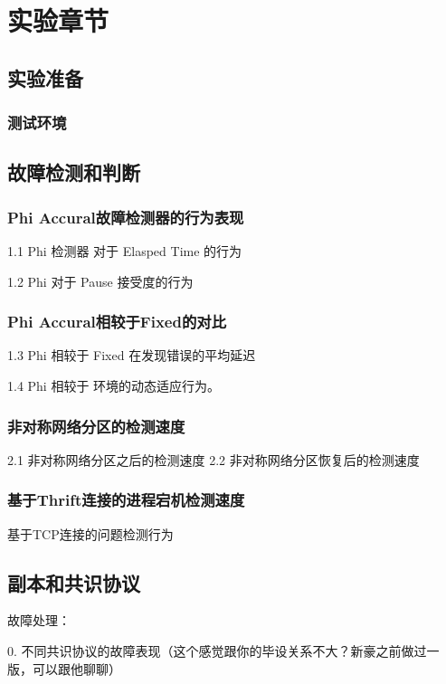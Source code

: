 
\chapter{实验章节}

\section{实验准备}

\subsection{测试环境}

\section{故障检测和判断}

\subsection{Phi Accural故障检测器的行为表现}
1.1 Phi 检测器 对于 Elasped Time 的行为

1.2 Phi 对于 Pause 接受度的行为
\subsection{Phi Accural相较于Fixed的对比}
1.3 Phi 相较于 Fixed 在发现错误的平均延迟

1.4 Phi 相较于 环境的动态适应行为。

\subsection{非对称网络分区的检测速度}

2.1 非对称网络分区之后的检测速度
2.2 非对称网络分区恢复后的检测速度

\subsection{基于Thrift连接的进程宕机检测速度}

基于TCP连接的问题检测行为

\section{副本和共识协议}


故障处理：

0. 不同共识协议的故障表现（这个感觉跟你的毕设关系不大？新豪之前做过一版，可以跟他聊聊）


